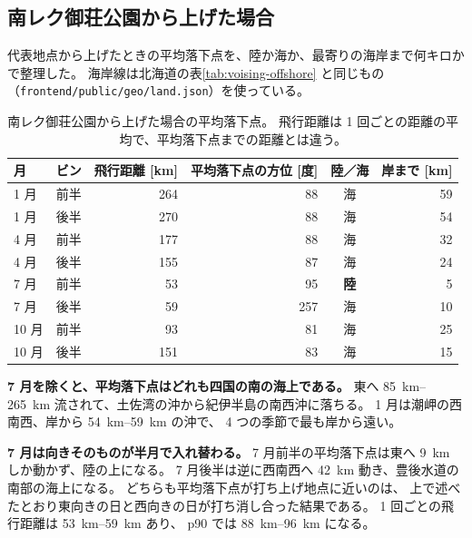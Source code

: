 \subsection{南レク御荘公園から上げた場合}

代表地点から上げたときの平均落下点を、陸か海か、最寄りの海岸まで何キロかで整理した。
海岸線は北海道の表\ref{tab:voising-offshore} と同じもの
（\texttt{frontend/public/geo/land.json}）を使っている。

\begin{table}[H]
\centering
\caption{南レク御荘公園から上げた場合の平均落下点。
飛行距離は 1 回ごとの距離の平均で、平均落下点までの距離とは違う。}
\label{tab:ainan-offshore}
\begin{tabular}{@{}llrrcr@{}}
\toprule
月 & ビン & {飛行距離 [\si{\kilo\metre}]} & {平均落下点の方位 [度]} & 陸／海 & {岸まで [\si{\kilo\metre}]} \\
\midrule
1 月  & 前半 & 264 & 88  & 海 & 59 \\
1 月  & 後半 & 270 & 88  & 海 & 54 \\
4 月  & 前半 & 177 & 88  & 海 & 32 \\
4 月  & 後半 & 155 & 87  & 海 & 24 \\
7 月  & 前半 & 53  & 95  & \textbf{陸} & 5 \\
7 月  & 後半 & 59  & 257 & 海 & 10 \\
10 月 & 前半 & 93  & 81  & 海 & 25 \\
10 月 & 後半 & 151 & 83  & 海 & 15 \\
\bottomrule
\end{tabular}
\end{table}

\textbf{7 月を除くと、平均落下点はどれも四国の南の海上である。}
東へ \SIrange{85}{265}{\kilo\metre} 流されて、土佐湾の沖から紀伊半島の南西沖に落ちる。
1 月は潮岬の西南西、岸から \SIrange{54}{59}{\kilo\metre} の沖で、
4 つの季節で最も岸から遠い。

\textbf{7 月は向きそのものが半月で入れ替わる。}
7 月前半の平均落下点は東へ \SI{9}{\kilo\metre} しか動かず、陸の上になる。
7 月後半は逆に西南西へ \SI{42}{\kilo\metre} 動き、豊後水道の南部の海上になる。
どちらも平均落下点が打ち上げ地点に近いのは、
上で述べたとおり東向きの日と西向きの日が打ち消し合った結果である。
1 回ごとの飛行距離は \SIrange{53}{59}{\kilo\metre} あり、
p90 では \SIrange{88}{96}{\kilo\metre} になる。

